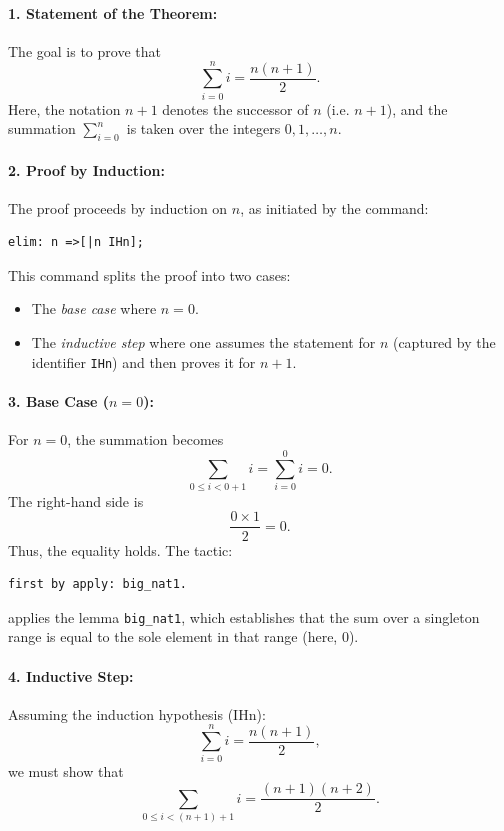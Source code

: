 \documentclass[10pt,nonacm,natbib=false]{acmart}
\begin{document}
\paragraph{1. Statement of the Theorem:}
The goal is to prove that
\[
\sum_{i=0}^{n} i = \frac{n(n+1)}{2}.  
\]
Here, the notation \( n+1 \) denotes the successor of \( n \) (i.e. \( n+1 \)), and the summation \(\sum_{i=0}^{n}\) is taken over the integers \( 0, 1, \dots, n \).

\paragraph{2. Proof by Induction:} 
The proof proceeds by induction on \( n \), as initiated by the command:
\begin{verbatim}
elim: n =>[|n IHn];
\end{verbatim}
This command splits the proof into two cases:
\begin{itemize}
    \item The \emph{base case} where \( n = 0 \).
    \item The \emph{inductive step} where one assumes the statement for \( n \) (captured by the identifier \verb|IHn|) and then proves it for \( n+1 \).
\end{itemize}

\paragraph{3. Base Case (\( n = 0 \)):}
For \( n = 0 \), the summation becomes
\[
\sum_{0 \le i < 0+1} i = \sum_{i=0}^{0} i = 0.
\]
The right-hand side is
\[
\frac{0 \times 1}{2} = 0.
\]
Thus, the equality holds. The tactic:
\begin{verbatim}
first by apply: big_nat1.
\end{verbatim}
applies the lemma \texttt{big\_nat1}, which establishes that the sum over a singleton range is equal to the sole element in that range (here, \(0\)).

\paragraph{4. Inductive Step:}
Assuming the induction hypothesis (IHn):
\[
\sum_{i=0}^{n} i = \frac{n(n+1)}{2},
\]
we must show that
\[
\sum_{0 \le i < (n+1)+1} i = \frac{(n+1)(n+2)}{2}.
\]
\end{document}
